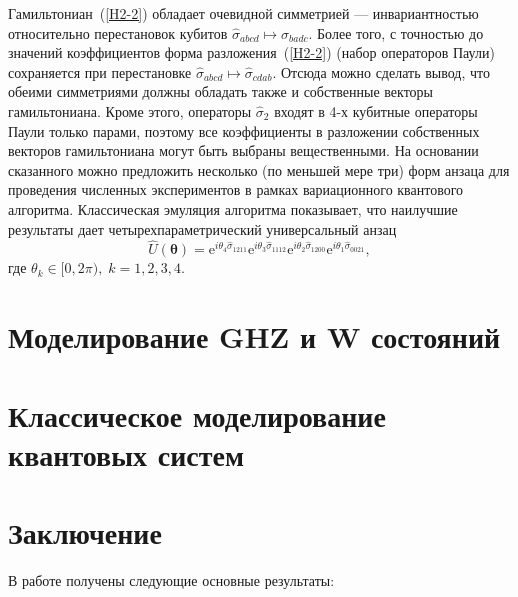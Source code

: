 \documentclass[a4paper]{report}
\begin{document}
Гамильтониан~(\ref{H2-2}) обладает очевидной симметрией --- инвариантностью относительно перестановок кубитов $\hat{\sigma}_{abcd}\mapsto\hat{\sigma}_{badc}$. Более того, с точностью до значений коэффициентов форма разложения~(\ref{H2-2}) (набор операторов Паули) сохраняется при перестановке $\hat{\sigma}_{abcd}\mapsto\hat{\sigma}_{cdab}$.  Отсюда можно сделать вывод, что обеими симметриями должны обладать также и собственные векторы гамильтониана. Кроме этого, операторы $\hat{\sigma}_{2}$ входят в 4-х кубитные операторы Паули только парами, поэтому все коэффициенты в разложении собственных векторов гамильтониана могут быть выбраны вещественными. На основании сказанного можно предложить несколько (по меньшей мере три) форм анзаца для проведения численных экспериментов в рамках вариационного квантового алгоритма. Классическая эмуляция алгоритма показывает, что наилучшие результаты дает четырехпараметрический универсальный анзац
\begin{equation}\label{ansatz}
\hat{U}(\bm\theta)= \mathrm{e}^{i\theta_4\hat{\sigma}_{1211}}\mathrm{e}^{i\theta_3\hat{\sigma}_{1112}} \mathrm{e}^{i\theta_2\hat{\sigma}_{1200}} \mathrm{e}^{i\theta_1\hat{\sigma}_{0021}},
\end{equation}
где $\theta_k\in[0,2\pi),\; k=1,2,3,4.$



\section{Моделирование GHZ и W состояний}

\section{Классическое моделирование квантовых систем}


\newpage
{}
\section*{Заключение}

В работе получены следующие основные результаты:


\newpage
{}
\end{document}
